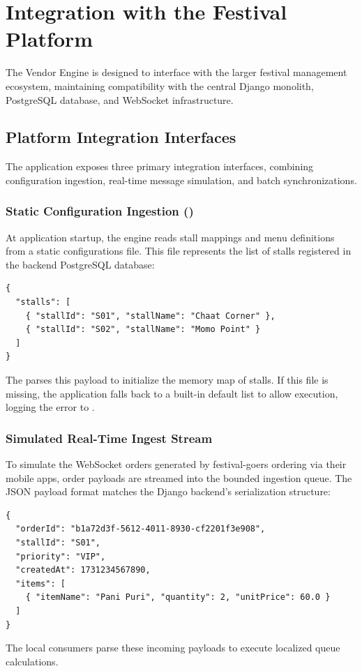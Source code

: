 
\section{Integration with the Festival Platform}
\label{sec:platform_integration}

The Vendor Engine is designed to interface with the larger festival management ecosystem, maintaining compatibility with the central Django monolith, PostgreSQL database, and WebSocket infrastructure. 

\subsection{Platform Integration Interfaces}
The application exposes three primary integration interfaces, combining configuration ingestion, real-time message simulation, and batch synchronizations.

\subsubsection{Static Configuration Ingestion ()}
At application startup, the engine reads stall mappings and menu definitions from a static configurations file. This file represents the list of stalls registered in the backend PostgreSQL database:
\begin{lstlisting}
{
  "stalls": [
    { "stallId": "S01", "stallName": "Chaat Corner" },
    { "stallId": "S02", "stallName": "Momo Point" }
  ]
}
\end{lstlisting}
The  parses this payload to initialize the memory map of stalls. If this file is missing, the application falls back to a built-in default list to allow execution, logging the error to .

\subsubsection{Simulated Real-Time Ingest Stream}
To simulate the WebSocket orders generated by festival-goers ordering via their mobile apps, order payloads are streamed into the bounded ingestion queue. The JSON payload format matches the Django backend's serialization structure:
\begin{lstlisting}
{
  "orderId": "b1a72d3f-5612-4011-8930-cf2201f3e908",
  "stallId": "S01",
  "priority": "VIP",
  "createdAt": 1731234567890,
  "items": [
    { "itemName": "Pani Puri", "quantity": 2, "unitPrice": 60.0 }
  ]
}
\end{lstlisting}
The local consumers parse these incoming payloads to execute localized queue calculations.

